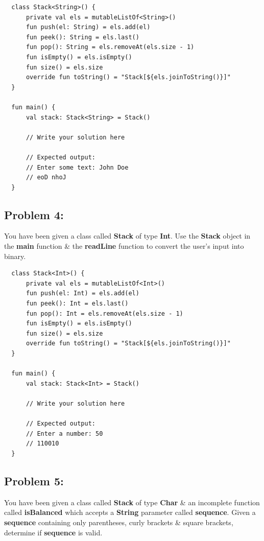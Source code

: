 \documentclass{article}
\begin{document}
\begin{verbatim}
  class Stack<String>() {
      private val els = mutableListOf<String>()
      fun push(el: String) = els.add(el)
      fun peek(): String = els.last()
      fun pop(): String = els.removeAt(els.size - 1)
      fun isEmpty() = els.isEmpty()
      fun size() = els.size
      override fun toString() = "Stack[${els.joinToString()}]"
  }

  fun main() {
      val stack: Stack<String> = Stack()

      // Write your solution here

      // Expected output:
      // Enter some text: John Doe
      // eoD nhoJ
  }
\end{verbatim}

\subsection*{Problem 4:}
You have been given a class called \textbf{Stack} of type \textbf{Int}. Use the \textbf{Stack} object in the \textbf{main} function \& the \textbf{readLine} function to convert the user's input into binary. 

\begin{verbatim}
  class Stack<Int>() {
      private val els = mutableListOf<Int>()
      fun push(el: Int) = els.add(el)
      fun peek(): Int = els.last()
      fun pop(): Int = els.removeAt(els.size - 1)
      fun isEmpty() = els.isEmpty()
      fun size() = els.size
      override fun toString() = "Stack[${els.joinToString()}]"
  }

  fun main() {
      val stack: Stack<Int> = Stack()

      // Write your solution here

      // Expected output:
      // Enter a number: 50
      // 110010
  }
\end{verbatim}

\subsection*{Problem 5:}
You have been given a class called \textbf{Stack} of type \textbf{Char} \& an incomplete function called \textbf{isBalanced} which accepts a \textbf{String} parameter called \textbf{sequence}. Given a \textbf{sequence} containing only parentheses, curly brackets \& square brackets, determine if \textbf{sequence} is valid.
\end{document}
